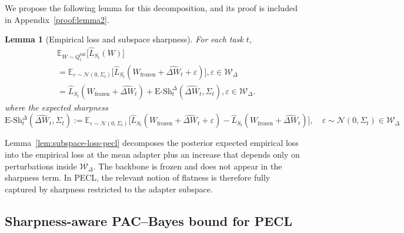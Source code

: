 \documentclass{article}
\theoremstyle{plain}
\newtheorem{lemma}[theorem]{Lemma}
\theoremstyle{definition}
\theoremstyle{remark}
\begin{document}
We propose the following lemma for this decomposition, and its proof is included in Appendix~\ref{proof:lemma2}.
\begin{lemma}[Empirical loss and subspace sharpness]
\label{lem:subspace-loss-pecl}
For each task $t$,
\begin{equation*}
\label{eq:subspace-loss-pecl}
\begin{aligned}
&\mathbb E_{W\sim Q_t^{\mathrm{full}}}\bigl[\hat L_{S_t}(W)\bigr] \\
&= \mathbb{E}_{\varepsilon\sim\mathcal N(0,\Sigma_t)}
    \big[\hat{L}_{S_t}(W_\mathrm {frozen }+\hat{\Delta W}_t+\varepsilon)\big],\varepsilon\in\mathcal W_\Delta \\
& =\hat L_{S_t}(W_{\mathrm{frozen}} + \hat{\Delta W}_t)
+
\mathrm{E\text{-}Sh}_t^\Delta(\hat{\Delta W}_t,\Sigma_t),\varepsilon\in\mathcal W_\Delta.
\end{aligned}
\end{equation*}
where the expected sharpness $
\mathrm{E\text{-}Sh}_t^{\Delta}(\hat{\Delta W}_t,\Sigma_t)
:= \mathbb{E}_{\varepsilon\sim\mathcal N(0,\Sigma_t)}
   \big[\hat{L}_{S_t}(W_\mathrm {frozen }+\hat{\Delta W}_t+\varepsilon)
       - \hat{L}_{S_t}(W_\mathrm {frozen }+\hat{\Delta W}_t)\big],\quad
\varepsilon\sim\mathcal N(0,\Sigma_t) \in  \mathcal W_\Delta$
\end{lemma}
Lemma~\eqref{lem:subspace-loss-pecl} decomposes the posterior expected empirical loss into the empirical loss at the mean adapter plus an increase that depends only on perturbations inside $\mathcal W_\Delta$. The backbone is frozen and does not appear in the sharpness term. In PECL, the relevant notion of flatness is therefore fully captured by sharpness restricted to the adapter subspace.





\subsection{Sharpness-aware PAC–Bayes bound for PECL}
\label{sec:pecl-bound-main}
\end{document}
